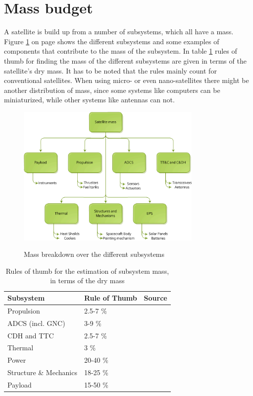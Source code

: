 \section{Mass budget}
\label{sect_mass_budget}
A satellite is build up from a number of subsystems, which all have a mass. Figure \ref{massbreakdown} on page \pageref{massbreakdown} shows the different subsystems and some examples of components that contribute to the mass of the subsystem. In table \ref{rotsubsystemmass} rules of thumb for finding the mass of the different subsystems are given in terms of the satellite's dry mass. It has to be noted that the rules mainly count for conventional satellites. When using micro- or even nano-satellites there might be another distribution of mass, since some systems like computers can be miniaturized, while other systems like antennas can not. 

\begin{figure} [h]
\centering
\includegraphics[width=0.8\textwidth]{chapters/img/mass_breakdown.png}
\label{massbreakdown}
\caption{Mass breakdown over the different subsystems}
\end{figure}

\begin{table} [h]
\centering
\begin{tabular}{p{10cm} l l}
Subsystem & Rule of Thumb & Source \\ \hline
Propulsion & 2.5-7 \% & \cite{Space2b} \\ 
\ac{ADCS} (incl. \ac{GNC}) & 3-9 \% & \cite{Space2b} \\ 
\ac{CDH} and \ac{TTC} & 2.5-7 \% & \cite{Space2b} \\ 
Thermal & 3 \% & \cite{larson} \\ 
Power & 20-40 \% & \cite{Space2b} \\ 
Structure \& Mechanics & 18-25 \% & \cite{Space2b} \\ 
Payload & 15-50 \% & \cite{larson} 
\end{tabular} 
\caption{Rules of thumb for the estimation of subsystem mass, in terms of the dry mass}
\label{rotsubsystemmass}
\end{table}

